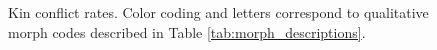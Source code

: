 \begin{figure}





\caption{ Kin conflict rates.
Color coding and letters correspond to qualitative morph codes described in Table \ref{tab:morph_descriptions}.}
\label{fig:conflict}

\end{figure}
